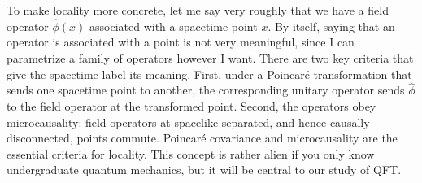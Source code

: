 To make locality more concrete, let me say very roughly that we have a field
operator $\hat\phi(x)$ associated with a spacetime point $x$.
By itself, saying that an operator is associated with a point is not very
meaningful, since I can parametrize a family of operators however I want.
There are two key criteria that give the spacetime label its meaning. First,
under a Poincaré transformation that sends one spacetime point to another, the
corresponding unitary operator sends $\hat\phi$ to the field operator at the
transformed point.
Second, the operators obey microcausality: field operators at
spacelike-separated, and hence causally disconnected, points commute. Poincaré
covariance and microcausality are the essential criteria for locality. This
concept is rather alien if you only know undergraduate quantum mechanics, but it
will be central to our study of QFT.

